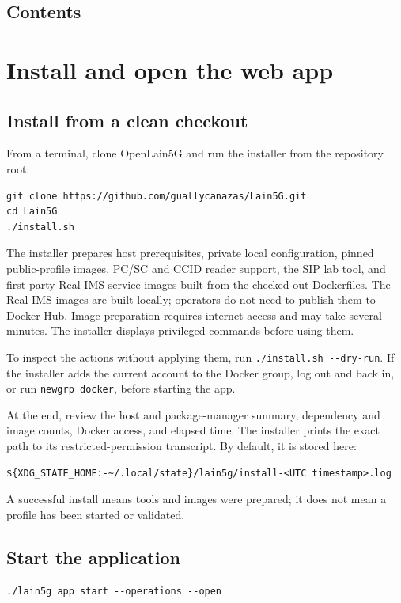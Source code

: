 \documentclass[11pt,a4paper,oneside]{article}
\newcommand{\cmd}[1]{\texttt{\small #1}}
\newcommand{\manualsection}[2]{\clearpage\section{#1}\label{#2}}
\begin{document}
\clearpage
\subsection*{Contents}
\setcounter{tocdepth}{1}
\tableofcontents
\clearpage

\manualsection{Install and open the web app}{install}
\subsection{Install from a clean checkout}
From a terminal, clone OpenLain5G and run the installer from the repository root:
\begin{codebox}
\begin{Verbatim}[fontsize=\small]
git clone https://github.com/guallycanazas/Lain5G.git
cd Lain5G
./install.sh
\end{Verbatim}
\end{codebox}

The installer prepares host prerequisites, private local configuration, pinned public-profile images, PC/SC and CCID reader support, the SIP lab tool, and first-party Real IMS service images built from the checked-out Dockerfiles. The Real IMS images are built locally; operators do not need to publish them to Docker Hub. Image preparation requires internet access and may take several minutes. The installer displays privileged commands before using them.

To inspect the actions without applying them, run \cmd{./install.sh \mbox{-}\mbox{-}dry-run}. If the installer adds the current account to the Docker group, log out and back in, or run \cmd{newgrp docker}, before starting the app.

At the end, review the host and package-manager summary, dependency and image counts, Docker access, and elapsed time. The installer prints the exact path to its restricted-permission transcript. By default, it is stored here:
\begin{codebox}
\begin{Verbatim}[fontsize=\small]
${XDG_STATE_HOME:-~/.local/state}/lain5g/install-<UTC timestamp>.log
\end{Verbatim}
\end{codebox}
A successful install means tools and images were prepared; it does not mean a profile has been started or validated.

\subsection{Start the application}
\begin{codebox}
\begin{Verbatim}[fontsize=\small]
./lain5g app start --operations --open
\end{Verbatim}
\end{codebox}
\end{document}
